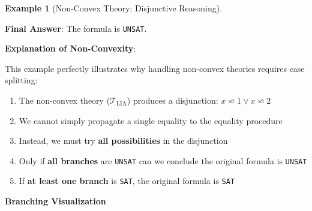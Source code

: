 \documentclass[11pt,a4paper]{article}
\theoremstyle{definition}
\newtheorem{example}{Example}[section]
\theoremstyle{plain}
\theoremstyle{remark}
\begin{document}
\begin{example}[Non-Convex Theory: Disjunctive Reasoning]
\begin{tcolorbox}[colback=purple!5!white,colframe=purple!75!black,title=\textbf{Example 3: Non-Convex $\mathcal{T}_{\text{LIA}}$ with Disjunctions},breakable]
\vspace{0.5em}

\textbf{Final Answer}: The formula is \texttt{UNSAT}.

\vspace{0.5em}

\textbf{Explanation of Non-Convexity}:

This example perfectly illustrates why handling non-convex theories requires case splitting:

\begin{enumerate}
    \item The non-convex theory ($\mathcal{T}_{\text{LIA}}$) produces a disjunction: $x \backsimeq 1 \vee x \backsimeq 2$
    \item We cannot simply propagate a single equality to the equality procedure
    \item Instead, we must try \textbf{all possibilities} in the disjunction
    \item Only if \textbf{all branches} are \texttt{UNSAT} can we conclude the original formula is \texttt{UNSAT}
    \item If \textbf{at least one branch} is \texttt{SAT}, the original formula is \texttt{SAT}
\end{enumerate}

\begin{center}
\textbf{Branching Visualization}
\end{center}

\begin{center}
\end{center}
\end{tcolorbox}
\end{example}
\end{document}

